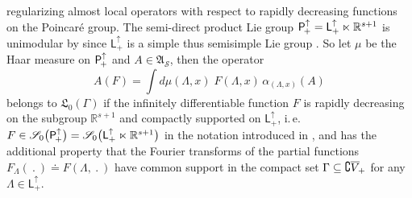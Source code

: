 \documentclass[11pt,twoside,openright]{report}
\theoremstyle{definition}
\theoremstyle{plain}
\theoremstyle{remark}
\theoremstyle{assumption}
\newcommand{\Lfrak}{\mathfrak{L}}
\newcommand{\Sscr}{\mathscr{S}}
\newcommand{\Rsone}{\mathbb{R}^{s + 1}}
\newcommand{\AS}{\mathfrak{A}_{\mathscr{S}}}
\newcommand{\Lor}{\mathsf{L}_+^\uparrow}
\newcommand{\Poin}{\mathsf{P}_{\negthinspace +}^\uparrow}
\newcommand{\fwcone}{\overline{V}_{\negthinspace +}}
\newcommand{\aLax}{\alpha_{( \Lambda , x )}}
\begin{document}
regularizing almost local operators with respect to rapidly decreasing
functions on the Poincar\'e group. The semi-direct product Lie group
$\Poin = \Lor \ltimes \Rsone$ is unimodular by \cite[Proposition~II.29
and Corollary]{nachbin:1965} since $\Lor$ is a simple thus semisimple
Lie group \cite[Proposition~I.1.6]{helgason:1984}. So let $\mu$ be the
Haar measure on $\Poin$ and $A \in \AS$, then the operator
\begin{equation}
  \label{eq-regularized-annihilator}
  A ( F ) = \int d \mu ( \Lambda , x ) \; F ( \Lambda , x ) \, \aLax (
  A )
\end{equation}
belongs to $\Lfrak_0 ( \Gamma )$ if the infinitely differentiable
function $F$ is rapidly decreasing on the subgroup $\Rsone$ and
compactly supported on $\Lor$, i.\,e.~$F \in \Sscr_0 \bigl( \Poin
\bigr) = \Sscr_0 \bigl( \Lor \ltimes \Rsone \bigr)$ in the notation
introduced in \cite{baumgaertel/wollenberg:1992}, and has the
additional property that the Fourier transforms of the partial
functions $F_\Lambda (~.~) \doteq F ( \Lambda ,~.~)$ have common
support in the compact set $\Gamma \subseteq \complement \fwcone$ for
any $\Lambda \in \Lor$.
\end{document}
